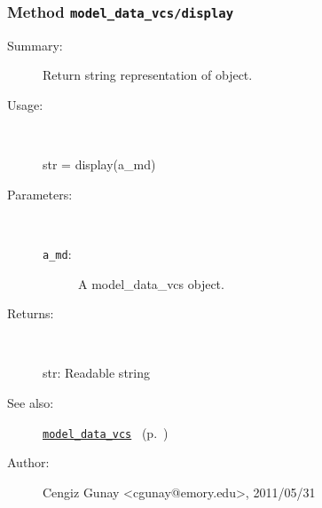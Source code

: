 \subsubsection[Method \texttt{display}]{Method \texttt{model\_data\_vcs/display}}%
%
\label{ref_model_data_vcs__display}%
\hypertarget{ref_model_data_vcs__display}{}%
\begin{description}
\item[Summary:]Return string representation of object.
%
\item[Usage:]~%
\begin{lyxcode}%
str = display(a\_md)
%
\end{lyxcode}%
%
%
\item[Parameters:]~
\begin{description}%
\item[\texttt{a\_md}:]
 A model\_data\_vcs object.
\end{description}%
%
\item[Returns:
]~

   str: Readable string
%
%
\item[See also:]%
\hyperlink{ref_model_data_vcs}{\texttt{model\_data\_vcs}}%
\ (p.~\pageref{ref_model_data_vcs})%
%
%
\item[Author:]%
Cengiz Gunay <cgunay@emory.edu>, 2011/05/31
%
\end{description}
\methodline%
